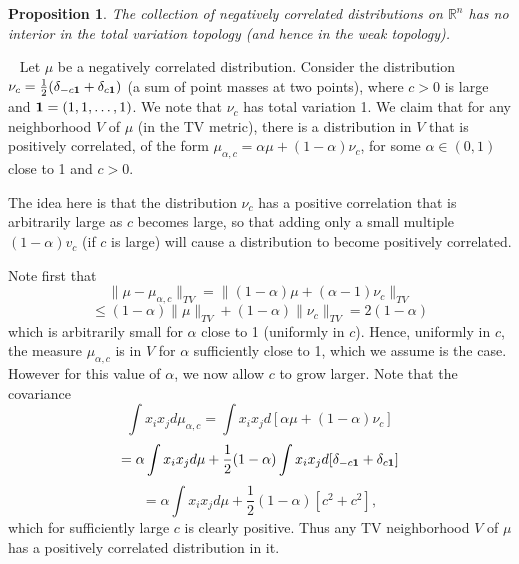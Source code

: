 \documentclass[11pt]{article}
\newcommand{\R}{\mathbb{R}}
\newtheorem{prop}{Proposition}
\newenvironment{Proof}{\noindent{\bf Proof} \ }{\QED}\smallskip
\newcommand\QED{\newline \rightline{$\blacksquare$} \bigskip}
\begin{document}
\begin{prop}\label{NCcompactinterior}
The collection of negatively correlated distributions on $\R^n$ has no interior in the total variation topology (and hence in the weak topology).
\end{prop}
\begin{Proof}
Let $\mu$ be a negatively correlated distribution. Consider the distribution $\nu_c=\frac{1}{2}(\delta_{-c{\bf 1}} +\delta_{c{\bf 1}})$ (a sum of point masses at two points), where $c>0$ is large and ${\bf 1} =(1,1,\dots,1)$. We note that $\nu_c$ has total variation 1. We claim that for any neighborhood $V$ of $\mu$ (in the TV metric), there is a distribution in $V$ that is positively correlated, of the form $\mu_{\alpha,c}= \alpha\mu +(1-\alpha)\nu_c$, for some $\alpha\in (0,1)$ close to 1 and $c>0$.

The idea here is that the distribution $\nu_c$ has a positive correlation that is arbitrarily large as $c$ becomes large, so that adding only a small multiple $(1-\alpha)v_c$ (if $c$ is large) will cause a distribution to become positively correlated. 

Note first that
\[
\lVert \mu - \mu_{\alpha,c}\rVert_{TV} = \lVert (1-\alpha)\mu +(\alpha-1)\nu_c\rVert_{TV}
\]
\[
\leq (1-\alpha)\lVert \mu \rVert_{TV} +(1-\alpha)\lVert \nu_c \rVert_{TV} = 2(1-\alpha)
\]
which is arbitrarily small for $\alpha$ close to 1 (uniformly in $c$). Hence, uniformly in $c$, the measure $\mu_{\alpha,c}$ is in $V$ for $\alpha$ sufficiently close to 1, which we assume is the case.
However for this value of $\alpha$, we now allow $c$ to grow larger. Note that the covariance
\[
\int x_i x_j d\mu_{\alpha,c}
= \int x_ix_jd[\alpha\mu +(1-\alpha) \nu_c]
\]
\[
    =\alpha\int x_ix_j d\mu +\frac{1}{2}(1-\alpha) \int x_ix_j d[\delta_{-c{\bf 1}} +\delta_{c{\bf 1}}]
    \]
    \[
    =\alpha\int x_ix_j d\mu +\frac{1}{2}(1-\alpha)[c^2+c^2],
    \]
which for sufficiently large $c$ is clearly positive. Thus any TV neighborhood $V$ of $\mu$ has a positively correlated distribution in it.
\end{Proof}
\end{document}
